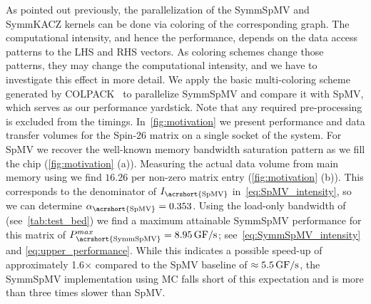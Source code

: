 
As pointed out previously, the parallelization of the \acrshort{SymmSpMV} and \acrshort{SymmKACZ} kernels can be done via \DTWO coloring of the corresponding graph. The computational intensity, and hence the performance, depends on the data access patterns to the LHS and RHS vectors. As coloring schemes change those patterns, they may change the computational intensity, and we have to investigate this effect in more detail. We apply the basic multi-coloring scheme generated by COLPACK~\cite{COLPACK} to parallelize \acrshort{SymmSpMV} and compare it with \acrshort{SpMV}, which serves as our performance yardstick. Note that any required pre-processing is excluded from the timings. In~\cref{fig:motivation} we present performance and data transfer volumes for the Spin-26 matrix on a single socket of the \IVB system. For \acrshort{SpMV} we recover the well-known memory bandwidth saturation pattern as we fill the chip (\cref{fig:motivation} (a)). Measuring the actual data volume from main memory using \LIKWID we find $16.26$ \BYTE per non-zero matrix entry (\cref{fig:motivation} (b)). This corresponds to the denominator of $I_\mathrm{\acrshort{SpMV}}$ in~\cref{eq:SpMV_intensity}, so we can determine $\alpha_\mathrm{\acrshort{SpMV}}=0.353$. Using the load-only bandwidth of \IVB (see~\cref{tab:test_bed}) we find a maximum attainable {\acrshort{SymmSpMV}} performance for this matrix of $P^{max}_\mathrm{\acrshort{SymmSpMV}}=8.95\,\GF$; see~\cref{eq:SymmSpMV_intensity} and \cref{eq:upper_performance}. While this indicates a possible speed-up of approximately 1.6$\times$ compared to the \acrshort{SpMV} baseline of $\approx 5.5\,\mbox{GF/s}$, the \acrshort{SymmSpMV} implementation using \acrfull{MC} falls short of this expectation and is more than three times slower than \acrshort{SpMV}. 
